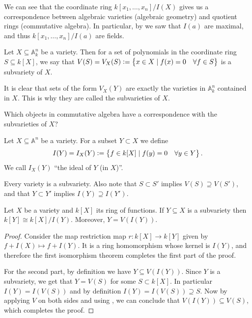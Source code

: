 \documentclass[11pt,a4paper]{article}
\newcommand{\A}{\mathbb A}
\begin{document}
\begin{remark}
  We can see that the coordinate ring $k[x_1,\dots,x_n]/I(X)$
  gives us a correspondence between algebraic varieties (algebraic geometry)
  and quotient rings (commutative algebra).
  In particular, by  we saw that
  $I(a)$ are maximal, and thus $k[x_1,\dots,x_n]/I(a)$ are fields.
\end{remark}

\begin{definition}[Subvarieties]
  Let $X \subseteq \A^n_k$ be a variety.
  Then for a set of polynomials in the coordinate ring $S \subseteq k[X]$,
  we say that $V(S) = V_X(S) := \left\{x \in X \mid f(x) = 0\quad \forall f \in S\right\}$
  is a subvariety of $X$.
\end{definition}

\begin{remark}
  It is clear that sets of the form $V_X(Y)$ are exactly the varieties in $\A_k^n$
  contained in $X$.
  This is why they are called the subvarieties of $X$.
\end{remark}

\begin{question}
  Which objects in commutative algebra
  have a correspondence with the subvarieties of $X$?
\end{question}

\begin{definition}
  Let $X \subseteq \A^n$ be a variety.
  For a subset $Y \subset X$ we define
  \[
    I(Y) = I_X(Y) := \left\{f \in k[X] \mid f(y) = 0 \quad \forall y \in Y\right\}.
  \]
  We call $I_X(Y)$ ``the ideal of $Y$ (in $X$)''.
\end{definition}

\begin{remark}
  \label{rmk:varieties-containment}
  Every variety is a subvariety.
  Also note that $S \subset S'$ implies $V(S) \supseteq V(S')$,
  and that $Y \subset Y'$ implies $I(Y) \supseteq I(Y')$.
\end{remark}

\begin{lemma}
  \label{lem:quotient-rings}
  Let $X$ be a variety and $k[X]$ its ring of functions.
  If $Y \subseteq X$ is a subvariety then $k[Y] \cong k[X]/I(Y)$.
  Moreover, $Y = V(I(Y))$.
\end{lemma}
\begin{proof}
  Consider the map restriction map $r \colon k[X] \to k[Y]$
  given by $f + I(X) \mapsto f + I(Y)$.
  It is a ring homomorphism whose kernel is $I(Y)$,
  and therefore the first isomorphism theorem completes the first part of the
  proof.

  For the second part, by definition we have $Y \subseteq V(I(Y))$.
  Since $Y$ is a subvariety, we get that $Y = V(S)$ for some $S \subset k[X]$.
  In particular $I(Y) = I(V(S))$ and by definition $I(Y) = I(V(S)) \supseteq S$.
  Now by applying $V$ on both sides and using ,
  we can conclude that $V(I(Y)) \subseteq V(S)$, which completes the proof.
\end{proof}
\end{document}
